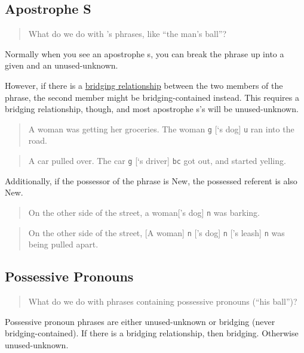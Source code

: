 \documentclass[
]{book}
\begin{document}
\hypertarget{apostrophe-s}{%
\subsection{Apostrophe S}\label{apostrophe-s}}

\begin{quote}
What do we do with 's phrases, like ``the man's ball''?
\end{quote}

Normally when you see an apostrophe s, you can break the phrase up into a given and an unused-unknown.

However, if there is a \protect\hyperlink{bridging-relationships}{bridging relationship} between the two members of the phrase, the second member might be bridging-contained instead.
This requires a bridging relationship, though, and most apostrophe s's will be unused-unknown.

\begin{quote}
A woman was getting her groceries.
The woman \texttt{g} {[}`s dog{]} \texttt{u} ran into the road.
\end{quote}

\begin{quote}
A car pulled over.
The car \texttt{g} {[}`s driver{]} \texttt{bc} got out, and started yelling.
\end{quote}

Additionally, if the possessor of the phrase is New,
the possessed referent is also New.

\begin{quote}
On the other side of the street, a woman{[}'s dog{]} \texttt{n} was barking.
\end{quote}

\begin{quote}
On the other side of the street,
{[}A woman{]} \texttt{n} {[}'s dog{]} \texttt{n} {[}'s leash{]} \texttt{n} was being pulled apart.
\end{quote}

\hypertarget{possessive-pronouns}{%
\subsection{Possessive Pronouns}\label{possessive-pronouns}}

\begin{quote}
What do we do with phrases containing possessive pronouns (``his ball'')?
\end{quote}

Possessive pronoun phrases are either unused-unknown or bridging (never bridging-contained).
If there is a bridging relationship, then bridging. Otherwise unused-unknown.
\end{document}
